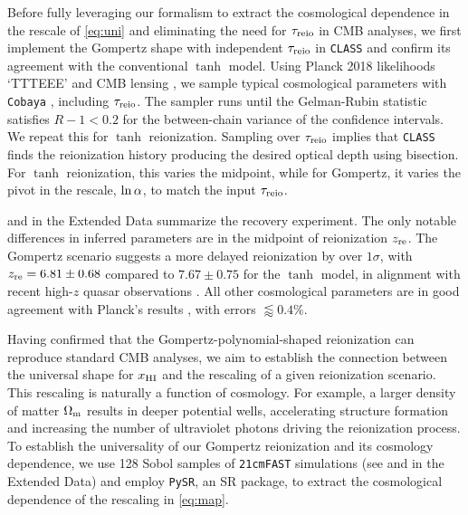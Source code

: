 Before fully leveraging our formalism to extract the cosmological
dependence in the rescale of \cref{eq:uni} and eliminating the
need for $\tau_{\mathrm{reio}}$ in CMB analyses, we first implement the Gompertz
shape with independent $\tau_{\mathrm{reio}}$ in \texttt{CLASS} and confirm its
agreement with the conventional $\tanh$ model.
Using Planck 2018 likelihoods `TTTEEE' \cite{Planck2020c} and CMB
lensing \cite{Planck2020d}, we sample typical cosmological parameters
with \texttt{Cobaya} \cite{Torrado2020}, including $\tau_{\mathrm{reio}}$.
The sampler runs until the Gelman-Rubin statistic \cite{Gelman1992}
satisfies $R - 1 < 0.2$ for the between-chain variance of the confidence
intervals.
We repeat this for $\tanh$ reionization.
Sampling over $\tau_{\mathrm{reio}}$ implies that \texttt{CLASS} finds the
reionization history producing the desired optical depth using
bisection.
For $\tanh$ reionization, this varies the midpoint, while for Gompertz,
it varies the pivot in the rescale, $\ln\alpha$, to match the input
$\tau_{\mathrm{reio}}$.

 and  in the Extended Data summarize the
recovery experiment.
The only notable differences in inferred parameters are in the midpoint
of reionization $z_{\mathrm{re}}$.
The Gompertz scenario suggests a more delayed reionization by over
$1\sigma$, with $z_{\mathrm{re}} = 6.81 \pm 0.68$ compared to $7.67 \pm 0.75$ for
the $\tanh$ model, in alignment with recent high-$z$ quasar observations
\cite{Keating2020}.
All other cosmological parameters are in good agreement with Planck's
results \cite{Planck2020a}, with errors $\lessapprox 0.4 \%$.

Having confirmed that the Gompertz-polynomial-shaped reionization can
reproduce standard CMB analyses,  we aim to establish the connection
between the universal shape for $x_{\mathrm{HI}}$ and the rescaling of a given
reionization scenario.
This rescaling is naturally a function of cosmology.
For example, a larger density of matter $\Omega_\mathrm{m}$ results in deeper
potential wells, accelerating structure formation and increasing the
number of ultraviolet photons driving the reionization process.
To establish the universality of our Gompertz reionization and its
cosmology dependence, we use 128 Sobol samples of \texttt{21cmFAST} simulations
(see  and  in the Extended Data)
and employ \texttt{PySR}, an SR package, to extract the cosmological
dependence of the rescaling in \cref{eq:map}.

